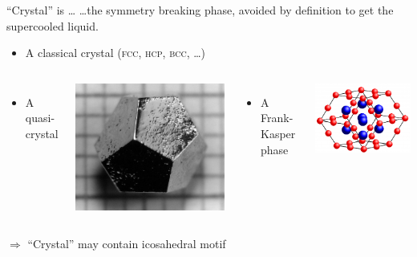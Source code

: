 \begin{frame}{``Crystal'' is \ldots}
\ldots the symmetry breaking phase, avoided \alert{by definition} to get the supercooled liquid.
\begin{itemize}
	\item A classical crystal (\textsc{fcc, hcp, bcc}, \ldots)
\end{itemize}
\begin{columns}[T]
	\centering
	\begin{itemize}\item A quasi-crystal\end{itemize}
	\includegraphics[height=0.5\columnwidth]{Ho-Mg-ZnQuasicrystal.jpg}\\
	{\footnotesize\citet{Doye2003}}
	\centering
	\begin{itemize}\item A Frank-Kasper phase\end{itemize}
	\includegraphics[height=0.5\columnwidth]{frankkasper.png}\\
	{\footnotesize\citet{Pedersen2010, Coslovich2011}}
\end{columns}

\bigskip
$\Rightarrow$ ``Crystal'' may contain icosahedral motif
\end{frame}

